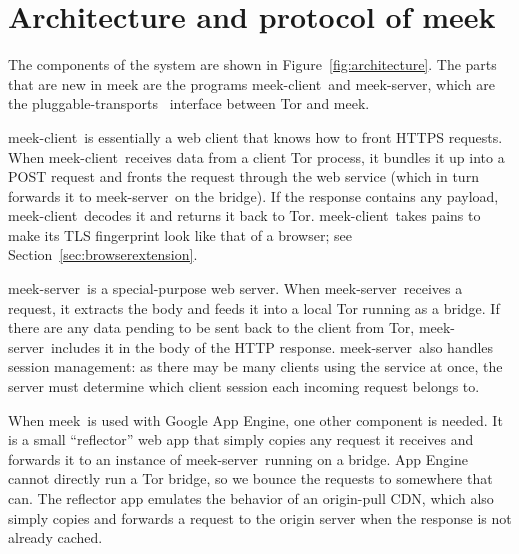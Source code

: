\documentclass[conference]{IEEEtran}
\def\meekclient{\mbox{meek-client}}
\def\meekserver{\mbox{meek-server}}
\def\meek{meek}
\begin{document}

\section{Architecture and protocol of \meek}
\label{sec:architecture}

The components of the system are shown in Figure~\ref{fig:architecture}.
The parts that are new in \meek
are the programs \meekclient\ and \meekserver,
which are the pluggable-transports~\cite{pt} interface between Tor and \meek.

\meekclient\ is essentially a web client that knows how to front HTTPS requests.
When \meekclient\ receives data from a client Tor process, it bundles it up into a POST request
and fronts the request through the web service
(which in turn forwards it to \meekserver\ on the bridge).
If the response contains any payload, \meekclient\ decodes it and returns it back to Tor.
\meekclient\ takes pains to make its TLS fingerprint
look like that of a browser; see Section~\ref{sec:browserextension}.

\meekserver\ is a special-purpose web server.
When \meekserver\ receives a request, it extracts the body and feeds it into
a local Tor running as a bridge.
If there are any data pending to be sent back to the client from Tor,
\meekserver\ includes it in the body of the HTTP response.
\meekserver\ also handles session management:
as there may be many clients using the service at once,
the server must determine which client session each incoming request belongs to.

When \meek\ is used with Google App Engine, one other component is needed.
It is a small ``reflector'' web app that simply copies any request
it receives and forwards it to an instance of \meekserver\ running on a bridge.
App Engine cannot directly run a Tor bridge,
so we bounce the requests to somewhere that can.
The reflector app emulates the behavior of an origin-pull CDN,
which also simply copies and forwards a request to the origin server
when the response is not already cached.
\end{document}
